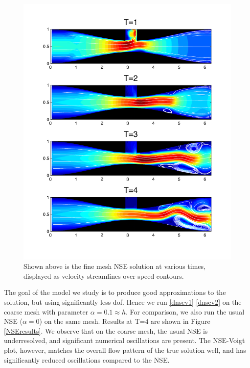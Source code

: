 \documentclass[11pt]{article}%
\numberwithin{equation}{section}
\begin{document}
\begin{figure}[h!]
\begin{center}
\includegraphics[width=.9\textwidth,height=0.8\textwidth, viewport=65 60 420 550, clip]{stackfine.pdf} 
\end{center}
\caption{\label{NSEfine}
Shown above is the fine mesh NSE solution at various times, displayed as velocity streamlines over speed contours.}
\end{figure}

The goal of the model we study is to produce good approximations to the solution, but using significantly less dof.  Hence we run \eqref{dnsev1}-\eqref{dnsev2} on the coarse mesh with parameter $\alpha=0.1 \approx h$.  For comparison, we also run the usual NSE ($\alpha=0$) on the same mesh.  Results at T=4 are shown in Figure \ref{NSEresults}.  We observe that on the coarse mesh, the usual NSE is underresolved, and significant numerical oscillations are present.  The NSE-Voigt plot, however, matches the overall flow pattern of the true solution well, and has significantly reduced oscillations compared to the NSE.
\end{document}
